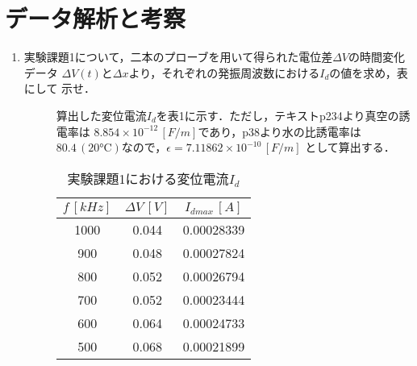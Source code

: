 
\section{データ解析と考察}

\begin{enumerate}
    \item 実験課題1について，二本のプローブを用いて得られた電位差$\Delta V$の時間変化データ
    $\Delta V(t)$と$\Delta x$より，それぞれの発振周波数における$I_d$の値を求め，表にして
    示せ．
    \begin{description}
        \item[] 算出した変位電流$I_d$を表1に示す．ただし，テキストp234より真空の誘電率は
        $8.854\times 10^{-12}\,[\si{F/m}]$であり，p38より水の比誘電率は
        $80.4\,(20\si{\celsius})$なので，$\epsilon=7.11862\times 10^{-10}\,[\si{F/m}]$
        として算出する．
        \begin{table}[H]
            \centering
            \caption{実験課題1における変位電流$I_d$}
            \begin{tabular}{c|c|c}
                \hline
                $f\,[\si{kHz}]$ & $\Delta V\,[\si{V}]$ & $I_{dmax}\,[\si{A}]$ \\ \hline
                1000 & 0.044 & 0.00028339 \\ 
                900 & 0.048 & 0.00027824 \\ 
                800 & 0.052 & 0.00026794 \\ 
                700 & 0.052 & 0.00023444 \\ 
                600 & 0.064 & 0.00024733 \\ 
                500 & 0.068 & 0.00021899 \\ \hline
            \end{tabular}
        \end{table}
    \end{description}


\end{enumerate}

